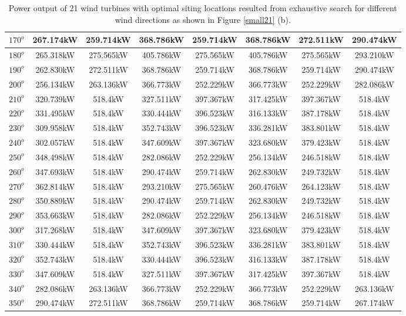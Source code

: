 \begin{table}[H]
\begin{tabular}{|c|c|c|c|c|c|c|c|}
		$170^o$	& 267.174kW	& 259.714kW	& 368.786kW	& 259.714kW	& 368.786kW	& 272.511kW	& 290.474kW	\\ \hline
		$180^o$	& 265.318kW	& 275.565kW	& 405.786kW	& 275.565kW	& 405.786kW	& 275.565kW	& 293.210kW	\\ \hline
		$190^o$	& 262.830kW	& 272.511kW	& 368.786kW	& 259.714kW	& 368.786kW	& 259.714kW	& 290.474kW	\\ \hline
		$200^o$	& 256.134kW	& 263.136kW	& 366.773kW	& 252.229kW	& 366.773kW	& 252.229kW	& 282.086kW	\\ \hline
		$210^o$	& 320.739kW	& 518.4kW	& 327.511kW	& 397.367kW	& 317.425kW	& 397.367kW	& 518.4kW	\\ \hline
		$220^o$	& 331.495kW	& 518.4kW	& 330.444kW	& 396.523kW	& 316.133kW	& 387.178kW	& 518.4kW	\\ \hline
		$230^o$	& 309.958kW	& 518.4kW	& 352.743kW	& 396.523kW	& 336.281kW	& 383.801kW	& 518.4kW	\\ \hline
		$240^o$	& 302.057kW	& 518.4kW	& 347.609kW	& 397.367kW	& 323.680kW	& 379.423kW	& 518.4kW	\\ \hline
		$250^o$	& 348.498kW	& 518.4kW	& 282.086kW	& 252.229kW	& 256.134kW	& 246.518kW	& 518.4kW	\\ \hline
		$260^o$	& 347.693kW	& 518.4kW	& 290.474kW	& 259.714kW	& 262.830kW	& 249.732kW	& 518.4kW	\\ \hline
		$270^o$	& 362.814kW	& 518.4kW	& 293.210kW	& 275.565kW	& 260.476kW	& 264.123kW	& 518.4kW	\\ \hline
		$280^o$	& 350.889kW	& 518.4kW	& 290.474kW	& 259.714kW	& 262.830kW	& 249.732kW	& 518.4kW	\\ \hline
		$290^o$	& 353.663kW	& 518.4kW	& 282.086kW	& 252.229kW	& 256.134kW	& 246.518kW	& 518.4kW	\\ \hline
		$300^o$	& 317.268kW	& 518.4kW	& 347.609kW	& 397.367kW	& 323.680kW	& 379.423kW	& 518.4kW	\\ \hline
		$310^o$	& 330.444kW	& 518.4kW	& 352.743kW	& 396.523kW	& 336.281kW	& 383.801kW	& 518.4kW	\\ \hline
		$320^o$	& 352.743kW	& 518.4kW	& 330.444kW	& 396.523kW	& 316.133kW	& 387.178kW	& 518.4kW	\\ \hline
		$330^o$	& 347.609kW	& 518.4kW	& 327.511kW	& 397.367kW	& 317.425kW	& 397.367kW	& 518.4kW	\\ \hline
		$340^o$	& 282.086kW	& 263.136kW	& 366.773kW	& 252.229kW	& 366.773kW	& 252.229kW	& 263.136kW	\\ \hline
		$350^o$	& 290.474kW	& 272.511kW	& 368.786kW	& 259.714kW	& 368.786kW	& 259.714kW	& 267.174kW	\\ \hline
        	\end{tabular}
        	\caption{Power output of 21 wind turbines with optimal siting locations resulted from exhaustive search for different wind directions as shown in Figure \ref{small21} (b).}
        	\label{table21b}
        \end{table}
